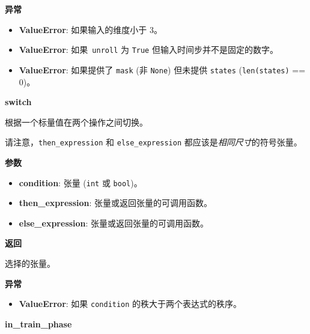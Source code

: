 \textbf{异常}

\begin{itemize}
\tightlist
\item
  \textbf{ValueError}: 如果输入的维度小于 3。
\item
  \textbf{ValueError}: 如果~\texttt{unroll} 为 \texttt{True}
  但输入时间步并不是固定的数字。
\item
  \textbf{ValueError}: 如果提供了 \texttt{mask} (非 \texttt{None})
  但未提供 \texttt{states} (\texttt{len(states)} == 0)。
\end{itemize}


\textbf{switch}\label{switch}

\begin{Shaded}
\begin{Highlighting}[]
\end{Highlighting}
\end{Shaded}

根据一个标量值在两个操作之间切换。

请注意，\texttt{then\_expression} 和 \texttt{else\_expression}
都应该是\emph{相同尺寸}的符号张量。

\textbf{参数}

\begin{itemize}
\tightlist
\item
  \textbf{condition}: 张量 (\texttt{int} 或 \texttt{bool})。
\item
  \textbf{then\_expression}: 张量或返回张量的可调用函数。
\item
  \textbf{else\_expression}: 张量或返回张量的可调用函数。
\end{itemize}

\textbf{返回}

选择的张量。

\textbf{异常}

\begin{itemize}
\tightlist
\item
  \textbf{ValueError}: 如果 \texttt{condition}
  的秩大于两个表达式的秩序。
\end{itemize}


\textbf{in\_train\_phase}\label{inux5ftrainux5fphase}

\begin{Shaded}
\begin{Highlighting}[]
\OperatorTok{=}\NormalTok{)}
\end{Highlighting}
\end{Shaded}

